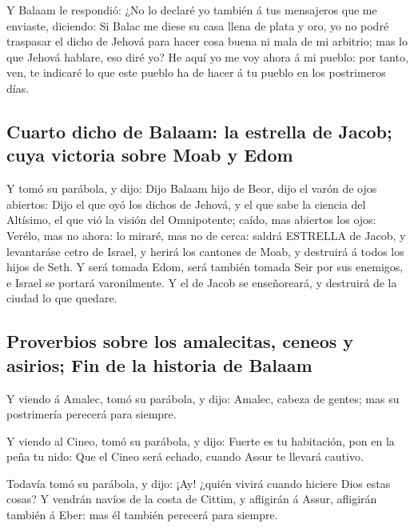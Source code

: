  Y Balaam le respondió: ¿No lo declaré yo también á tus
mensajeros que me enviaste, diciendo:  Si Balac me diese su
casa llena de plata y oro, yo no podré traspasar el dicho de Jehová para
hacer cosa buena ni mala de mi arbitrio; mas lo que Jehová hablare, eso
diré yo?  He aquí yo me voy ahora á mi pueblo: por tanto,
ven, te indicaré lo que este pueblo ha de hacer á tu pueblo en los
postrimeros días.

\hypertarget{cuarto-dicho-de-balaam-la-estrella-de-jacob-cuya-victoria-sobre-moab-y-edom}{%
\subsection{Cuarto dicho de Balaam: la estrella de Jacob; cuya victoria
sobre Moab y
Edom}\label{cuarto-dicho-de-balaam-la-estrella-de-jacob-cuya-victoria-sobre-moab-y-edom}}

 Y tomó su parábola, y dijo: Dijo Balaam hijo de Beor, dijo
el varón de ojos abiertos:  Dijo el que oyó los dichos de
Jehová, y el que sabe la ciencia del Altísimo, el que vió la visión del
Omnipotente; caído, mas abiertos los ojos:  Verélo, mas no
ahora: lo miraré, mas no de cerca: saldrá ESTRELLA de Jacob, y
levantaráse cetro de Israel, y herirá los cantones de Moab, y destruirá
á todos los hijos de Seth.  Y será tomada Edom, será
también tomada Seir por sus enemigos, e Israel se portará varonilmente.
 Y el de Jacob se enseñoreará, y destruirá de la ciudad lo
que quedare.

\hypertarget{proverbios-sobre-los-amalecitas-ceneos-y-asirios-fin-de-la-historia-de-balaam}{%
\subsection{Proverbios sobre los amalecitas, ceneos y asirios; Fin de la
historia de
Balaam}\label{proverbios-sobre-los-amalecitas-ceneos-y-asirios-fin-de-la-historia-de-balaam}}

 Y viendo á Amalec, tomó su parábola, y dijo: Amalec,
cabeza de gentes; mas su postrimería perecerá para siempre.

 Y viendo al Cineo, tomó su parábola, y dijo: Fuerte es tu
habitación, pon en la peña tu nido:  Que el Cineo será
echado, cuando Assur te llevará cautivo.

 Todavía tomó su parábola, y dijo: ¡Ay! ¿quién vivirá
cuando hiciere Dios estas cosas?  Y vendrán navíos de la
costa de Cittim, y afligirán á Assur, afligirán también á Eber: mas él
también perecerá para siempre.

